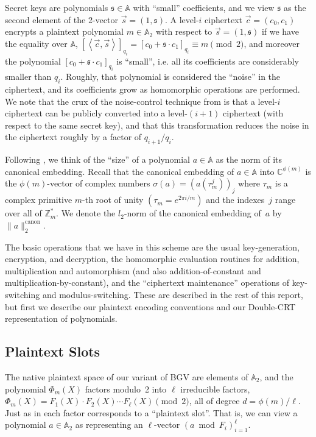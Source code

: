 \documentclass[14pt]{extarticle}
\newcommand{\A}{\mathbb{A}}
\newcommand{\C}{\mathbb{C}}
\newcommand{\Z}{\mathbb{Z}}
\newcommand{\vect}[1]{\left\langle{#1}\right\rangle}
\def\vc{\vec{c}}
\def\vs{\vec{s}}
\newcommand{\sk}{\mathfrak{s}}
\begin{document}
Secret keys are polynomials $\sk\in\A$ with ``small'' coefficients,
and we view $\sk$ as the second element of the 2-vector $\vs=(1,\sk)$.
A level-$i$ ciphertext $\vc=(c_0,c_1)$ encrypts a plaintext polynomial
$m\in \A_2$ with respect to $\vs=(1,\sk)$ if we have the equality over
$\A$, $[\vect{\vc,\vs}]_{q_i} = [c_0 + \sk \cdot c_1]_{q_i} \equiv m
\pmod{2}$, and moreover the polynomial $[c_0 + \sk \cdot c_1]_{q_i}$
is ``small'', i.e. all its coefficients are considerably smaller than
$q_i$. Roughly, that polynomial is considered the ``noise'' in the
ciphertext, and its coefficients grow as homomorphic operations are
performed. We note that the crux of the noise-control technique from
\cite{BGV12} is that a level-$i$ ciphertext can be publicly converted
into a level-$(i+1)$ ciphertext (with respect to the same secret key),
and that this transformation reduces the noise in the ciphertext
roughly by a factor of $q_{i+1}/q_i$.

Following \cite{LPR10,GHS12a,GHS12c}, we think of the ``size'' of a
polynomial $a\in\A$ as the norm of its canonical embedding. Recall that
the canonical embedding of $a\in\A$ into $\C^{\phi(m)}$ is the
$\phi(m)$-vector of complex numbers $\sigma(a)=(a(\tau_m^j))_j$
where $\tau_m$ is a complex primitive $m$-th root of unity
$(\tau_m=e^{2\pi i/m})$ and the indexes~$j$ range over all of
$\Z_m^*$. We denote the $l_2$-norm of the canonical embedding
of~$a$ by $\|a\|_2^{\mathrm{canon}}$.

The basic operations that we have in this scheme are the usual
key-generation, encryption, and decryption, the homomorphic evaluation
routines for addition, multiplication and automorphism (and also
addition-of-constant and multiplication-by-constant), and the
``ciphertext maintenance'' operations of key-switching and
modulus-switching. These are described in the rest of this report,
but first we describe our plaintext encoding conventions and our
Double-CRT representation of polynomials.

\subsection{Plaintext Slots} \label{sec:slots}
The native plaintext space of our variant of BGV are elements of
$\A_2$, and the polynomial $\Phi_m(X)$ factors modulo~2 into $\ell$
irreducible factors, $\Phi_m(X)=F_1(X)\cdot F_2(X) \cdots F_{\ell}(X)
\pmod 2$, all of degree $d=\phi(m)/\ell$.
Just as in \cite{BGV12,GHS12a,SV11} each factor corresponds to a
``plaintext slot''. That is, we can view a polynomial $a\in\A_2$ as
representing an $\ell$-vector $(a\bmod F_i)_{i=1}^{\ell}$.
\end{document}
